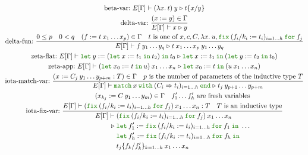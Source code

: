 \documentclass[a4paper,fleqn]{article}
\newcommand{\kwlet}{\mbox{\color{mygreen}\ttfamily let}}
\newcommand{\kwin}{\mbox{\color{mygreen}\ttfamily in}}
\newcommand{\kwmatch}{\mbox{\color{mygreen}\ttfamily match}}
\newcommand{\kwwith}{\mbox{\color{mygreen}\ttfamily with}}
\newcommand{\kwend}{\mbox{\color{mygreen}\ttfamily end}}
\newcommand{\kwfix}{\mbox{\color{mygreen}\ttfamily fix}}
\newcommand{\kwfor}{\mbox{\color{mygreen}\ttfamily for}}
\newcommand{\lam}[2]{\lambda #1.\:#2}
\newcommand{\letin}[3]{\kwlet\:#1:=#2\:\kwin\:#3}
\newcommand{\letinB}[2]{\kwlet\:#1:=#2\:\kwin}
\newcommand{\match}[4]{\kwmatch\:#1\:\kwwith\:(#2 \Rightarrow #3)_{#4}\:\kwend}
\newcommand{\fix}[4]{\kwfix\:(#1 := #2)_{#3}\:\kwfor\:#4}
\newcommand{\subst}[3]{#1\{#2/#3\}}
\newcommand{\reltri}{\mathrel{\triangleright}}
\begin{document}
\begin{gather*}
  \text{beta-var:}~
    E[\Gamma] \vdash (\lam{x}{t})\:y \reltri \subst{t}{x}{y} \\
  \text{delta-var:}~
    \dfrac{(x:=y) \in \Gamma}{E[\Gamma] \vdash x \reltri y} \\
  \text{delta-fun:}~
     \dfrac
     {
       0 \leq p \quad
       0 < q \quad
       (f := t\:x_1\ldots x_p) \in \Gamma \quad
       \text{$t$ is one of $x, c, C, \lam{x}{u}, \fix{f_i/k_i}{t_i}{i=1\ldots h}{f_j}$}
     }{
       E[\Gamma] \vdash f\:y_1\ldots y_q
                        \reltri
                        t\:x_1\ldots x_p\:y_1\ldots y_q
     } \\
  \text{zeta-flat:}~
    E[\Gamma] \vdash \letin{y}{(\letin{x}{t_1}{t_2})}{t_0}
                       \reltri
                       \letin{x}{t_1}{(\letin{y}{t_2}{t_0})} \\
  \text{zeta-app:}~
    E[\Gamma] \vdash
     (\letin{x_0}{t}{u})\:x_1\ldots x_n
     \reltri
     \letin{x_0}{t}{(u\:x_1\ldots x_n)} \\
  \text{iota-match-var:}~
    \dfrac
    {
      (x:=C_j\:y_1\ldots y_{p+m}:T) \in \Gamma \quad
      \text{$p$ is the number of parameters of the inductive type $T$}
    }{
      E[\Gamma] \vdash
      \match{x}{C_i}{t_i}{i=1\ldots h}
      \reltri
      t_j\:y_{p+1}\ldots y_{p+m}
    } \\
  \text{iota-fix-var:}~
    \dfrac
    {
      \begin{gathered}
        (x_{k_j} := C\:y_1\ldots y_m) \in \Gamma \quad
        \text{$f'_1\ldots f'_h$ are fresh variables} \\
        E[\Gamma] \vdash (\fix{f_i/k_i}{t_i}{i=1\ldots h}{f_j})\:x_1\ldots x_n : T \quad
        \text{$T$ is an inductive type}
      \end{gathered}
    }{
      \begin{aligned}
        E[\Gamma] \vdash\; &
          (\fix{f_i/k_i}{t_i}{i=1\ldots h}{f_j})\:x_1\ldots x_n \\
        \reltri\; &
          \begin{aligned}[t]
          & \letinB{f'_1}{\fix{f_i/k_i}{t_i}{i=1\ldots h}{f_1}} ~\ldots \\
          & \letinB{f'_h}{\fix{f_i/k_i}{t_i}{i=1\ldots h}{f_h}} \\
          & \subst{t_j}{f_k}{f'_k}_{k=1\ldots h} \:x_1 \ldots x_n
          \end{aligned}
      \end{aligned}
    } \\

\end{gather*}
\end{document}

